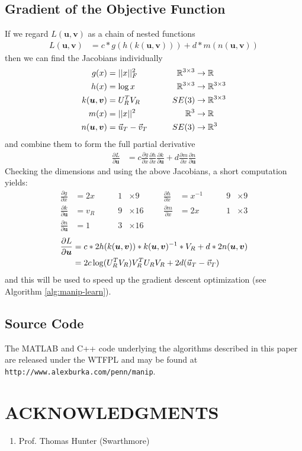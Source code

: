 \documentclass[letterpaper, 10 pt, conference]{ieeeconf}  %
\newcommand\deriv[2]{\ensuremath{\frac{\partial #1}{\partial #2}}}
\def\xmat{\uppercase}    \def\xmatstr{in uppercase}
\def\xvec{\vec}          \def\xvecstr{with an arrow}
\def\xse{\bm}            \def\xsestr{in boldface}
\begin{document}
\subsection{Gradient of the Objective Function} \label{sec:gradient}
If we regard $L(\xse{u},\xse{v})$ as a chain of nested functions
\begin{align}
  L(\xse{u},\xse{v}) &= c*g(h(k(\xse{u}, \xse{v}))) + d*m(n(\xse{u}, \xse{v}))
\end{align}
then we can find the Jacobians individually
\begin{alignat*}{3}
  g(x) &= ||x||_F^2 \quad\quad& \mathbb{R}^{3 \times 3} &\rightarrow \mathbb{R} \\
  h(x) &= \log{x} \quad\quad& \mathbb{R}^{3 \times 3} &\rightarrow \mathbb{R}^{3 \times 3} \\
  k(\xse{u},\xse{v}) &= \xmat{u}_R^T \xmat{v}_R \quad\quad& SE(3) &\rightarrow \mathbb{R}^{3 \times 3} \\
  m(x) &= ||x||^2 \quad\quad& \mathbb{R}^3 &\rightarrow \mathbb{R} \\
  n(\xse{u},\xse{v}) &= \xvec{u}_T - \xvec{v}_T \quad\quad& SE(3) &\rightarrow \mathbb{R}^3
\end{alignat*}
and combine them to form the full partial derivative
\begin{align}
  \deriv{L}{\xse{u}} &= c\deriv{g}{x}\deriv{h}{x}\deriv{k}{\xse{u}} + d\deriv{m}{x}\deriv{n}{\xse{u}}
\end{align}
Checking the dimensions and using the above Jacobians, a short computation yields:
\begin{align*}
  \deriv{g}{x} &= 2x \quad\quad& 1 &\times 9 &&& %
  \deriv{h}{x} &= x^{-1} \quad\quad& 9 &\times 9 \\
  \deriv{k}{\xse{u}} &= v_R \quad\quad& 9 &\times 16 &&&
  \deriv{m}{x} &= 2x \quad\quad& 1 &\times 3 \\
  \deriv{n}{\xse{u}} &= 1 \quad\quad& 3 &\times 16
\end{align*}
\begin{align}
  \deriv{L}{\xse{u}} &= c*2h(k(\xse{u},\xse{v}))*k(\xse{u},\xse{v})^{-1}*\xmat{v}_R + d*2n(\xse{u},\xse{v}) \nonumber\\
                     &= 2c\log(\xmat{u}_R^T\xmat{v}_R)\xmat{v}_R^T\xmat{u}_R\xmat{v}_R + 2d(\xvec{u}_T-\xvec{v}_T)
\end{align}
and this will be used to speed up the gradient descent optimization (see Algorithm \ref{alg:manip-learn}).

\subsection{Source Code}
The MATLAB and C++ code underlying the algorithms described in this paper are released under the WTFPL and may be found at \texttt{http://www.alexburka.com/penn/manip}.

\section*{ACKNOWLEDGMENTS}

\begin{enumerate}
  \item Prof. Thomas Hunter (Swarthmore)
\end{enumerate}




\end{document}
